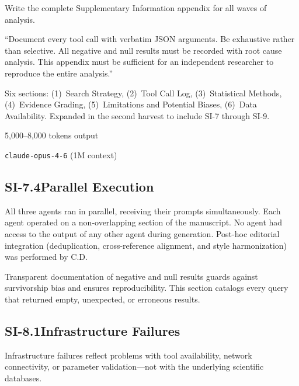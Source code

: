 \begin{description}[style=nextline, nosep]
  \item[Assignment]
    Write the complete Supplementary Information appendix for all waves of
    analysis.
  \item[Key directive]
    ``Document every tool call with verbatim JSON arguments.  Be exhaustive
    rather than selective.  All negative and null results must be recorded
    with root cause analysis.  This appendix must be sufficient for an
    independent researcher to reproduce the entire analysis.''
  \item[Structure specified]
    Six sections: (1)~Search Strategy, (2)~Tool Call Log, (3)~Statistical
    Methods, (4)~Evidence Grading, (5)~Limitations and Potential Biases,
    (6)~Data Availability.  Expanded in the second harvest to include
    SI-7 through SI-9.
  \item[Approximate token budget] 5,000--8,000 tokens output
  \item[Model] \texttt{claude-opus-4-6} (1M context)
\end{description}

\subsection*{SI-7.4\quad Parallel Execution}

All three agents ran in parallel, receiving their prompts simultaneously.
Each agent operated on a non-overlapping section of the manuscript.  No agent
had access to the output of any other agent during generation.  Post-hoc
editorial integration (deduplication, cross-reference alignment, and style
harmonization) was performed by C.D.



Transparent documentation of negative and null results guards against
survivorship bias and ensures reproducibility.  This section catalogs every
query that returned empty, unexpected, or erroneous results.

\subsection*{SI-8.1\quad Infrastructure Failures}

Infrastructure failures reflect problems with tool availability, network
connectivity, or parameter validation---not with the underlying scientific
databases.

